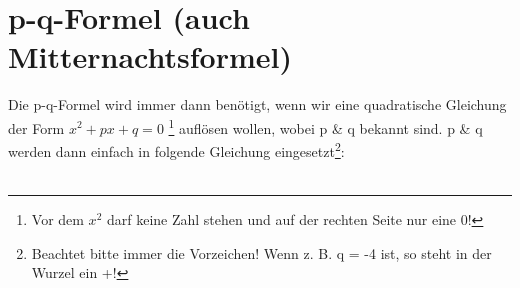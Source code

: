\section{p-q-Formel (auch Mitternachtsformel)}
	Die p-q-Formel wird immer dann benötigt, wenn wir eine quadratische Gleichung
	der Form \(x^2 + p x + q = 0\) \footnote{Vor dem \(x^2\) darf keine Zahl stehen
	und auf der rechten Seite nur eine 0!} auflösen wollen, wobei p \& q bekannt
	sind. p \& q werden dann einfach in folgende Gleichung
	eingesetzt\footnote{Beachtet bitte immer die Vorzeichen! Wenn z. B. q = -4 ist,
	so steht in der Wurzel ein +!}:
	\\ \\
	\formel{
		\[x_{1,2}=-\frac{p}{2}\pm \sqrt{\left ( \frac{p}{2} \right)^2-q}\]
	}
